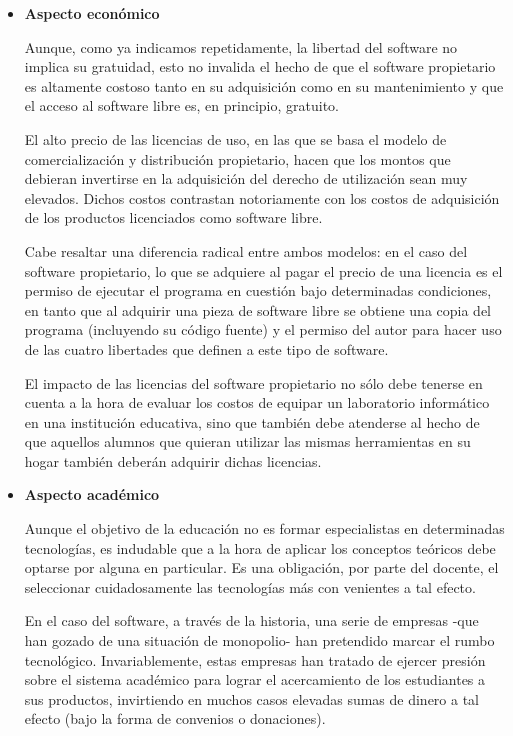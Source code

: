 \begin{itemize}

\item {\bf Aspecto económico}

Aunque, como ya indicamos repetidamente, la libertad del software no implica su gratuidad, esto no invalida el hecho de que el software propietario es altamente costoso tanto en su adquisición como en su mantenimiento y que el acceso al software libre es, en principio, gratuito.

El alto precio de las licencias de uso, en las que se basa el modelo de comercialización y distribución propietario, hacen que los montos que debieran invertirse en la adquisición del derecho de utilización sean muy elevados. Dichos costos contrastan notoriamente con los costos de adquisición de los productos licenciados como software libre.
 
Cabe resaltar una diferencia radical entre ambos modelos: en el caso del software propietario, lo que se adquiere al pagar el precio de una licencia es el permiso de ejecutar el programa en cuestión bajo determinadas condiciones, en tanto que al adquirir una pieza de software libre se obtiene una copia del programa (incluyendo su código fuente) y el permiso del autor para hacer uso de las cuatro libertades que definen a este tipo de software.

El impacto de las licencias del software propietario no sólo debe tenerse en cuenta a la hora de evaluar los costos de equipar un laboratorio informático en una institución educativa, sino que también debe atenderse al hecho de que aquellos alumnos que quieran utilizar las mismas herramientas en su hogar también deberán adquirir dichas licencias. 

\item {\bf Aspecto académico}

Aunque el objetivo de la educación no es formar especialistas en determinadas tecnologías, es indudable que a la hora de aplicar los conceptos teóricos debe optarse por alguna en particular. Es una obligación, por parte del docente, el seleccionar cuidadosamente las tecnologías más con venientes a tal efecto.

En el caso del software, a través de la historia, una serie de empresas -que han gozado de una situación de monopolio- han pretendido marcar el rumbo tecnológico. Invariablemente, estas empresas han tratado de ejercer presión sobre el sistema académico para lograr el acercamiento de los estudiantes a sus productos, invirtiendo en muchos casos elevadas sumas de dinero a tal efecto (bajo la forma de convenios o donaciones). 


\end{itemize}
